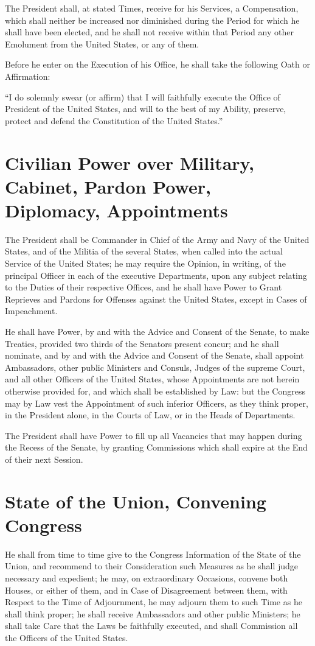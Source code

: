 \documentclass{constitution}
\begin{document}
The President shall, at stated Times, receive for his Services, a Compensation, which shall neither be increased nor diminished during the Period for which he shall have been elected,
and he shall not receive within that Period any other Emolument from the United States, or any of them.

Before he enter on the Execution of his Office, he shall take the following Oath or Affirmation:

“I do solemnly swear (or affirm) that I will faithfully execute the Office of President of the United States,
and will to the best of my Ability,
preserve, protect and defend the Constitution of the United States.”

\section{Civilian Power over Military, Cabinet, Pardon Power, Diplomacy, Appointments}
The President shall be Commander in Chief of the Army and Navy of the United States,
and of the Militia of the several States, when called into the actual Service of the United States;
he may require the Opinion, in writing, of the principal Officer in each of the executive Departments, upon any subject relating to the Duties of their respective Offices,
and he shall have Power to Grant Reprieves and Pardons for Offenses against the United States, except in Cases of Impeachment.

He shall have Power, by and with the Advice and Consent of the Senate, to make Treaties,
provided two thirds of the Senators present concur;
and he shall nominate, and by and with the Advice and Consent of the Senate, shall appoint Ambassadors,
other public Ministers and Consuls,
Judges of the supreme Court,
and all other Officers of the United States, whose Appointments are not herein otherwise provided for, and which shall be established by Law:
but the Congress may by Law vest the Appointment of such inferior Officers, as they think proper,
in the President alone, in the Courts of Law, or in the Heads of Departments.

The President shall have Power to fill up all Vacancies that may happen during the Recess of the Senate,
by granting Commissions which shall expire at the End of their next Session.

\section{State of the Union, Convening Congress}
He shall from time to time give to the Congress Information of the State of the Union,
and recommend to their Consideration such Measures as he shall judge necessary and expedient;
he may, on extraordinary Occasions, convene both Houses, or either of them,
and in Case of Disagreement between them, with Respect to the Time of Adjournment, he may adjourn them to such Time as he shall think proper;
he shall receive Ambassadors and other public Ministers;
he shall take Care that the Laws be faithfully executed,
and shall Commission all the Officers of the United States.
\end{document}
